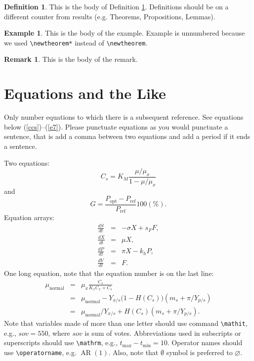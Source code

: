 \documentclass[ecta,nameyear,draft]{econsocart}
\theoremstyle{plain}
\theoremstyle{definition}
\newtheorem{definition}{Definition}
\newtheorem*{example}{Example}
\newtheorem{remark}{Remark}
\begin{document}
\begin{definition}\label{de1}
This is the body of Definition \ref{de1}. Definitions should be on a different counter from results (e.g. Theorems, Propositions, Lemmas).
\end{definition}

\begin{example}
This is the body of the example. Example is unnumbered because we used \verb|\newtheorem*|
instead of \verb|\newtheorem|.
\end{example}

\begin{remark}
This is the body of the remark. 
\end{remark}

\section{Equations and the Like}
Only number equations to which there is a subsequent reference.
See equations below (\ref{ccs})--(\ref{e7}). Please punctuate equations as you would punctuate a sentence, that is add a comma between two equations and add a period if it ends a sentence.

Two equations:
\begin{equation}
    C_{s}  =  K_{M} \frac{\mu/\mu_{x}}{1-\mu/\mu_{x}} \label{ccs}
\end{equation}
and
\begin{equation}
    G = \frac{P_{\mathrm{opt}} - P_{\mathrm{ref}}}{P_{\mathrm{ref}}}  100(\%).
\end{equation}
Equation arrays:
\begin{eqnarray}
  \frac{dS}{dt} & = & - \sigma X + s_{F} F,\\
  \frac{dX}{dt} & = &   \mu    X,\\
  \frac{dP}{dt} & = &   \pi    X - k_{h} P,\\
  \frac{dV}{dt} & = &   F.
\end{eqnarray}
One long equation, note that the equation number is on the last line:
\begin{eqnarray}
 \mu_{\text{normal}} & = & \mu_{x} \frac{C_{s}}{K_{x}C_{x}+C_{s}}  \nonumber\\
                     & = & \mu_{\text{normal}} - Y_{x/s}\bigl(1-H(C_{s})\bigr)(m_{s}+\pi /Y_{p/s})\nonumber\\
                     & = & \mu_{\text{normal}}/Y_{x/s}+ H(C_{s}) (m_{s}+ \pi /Y_{p/s}).\label{e7}
\end{eqnarray}
Note that variables made of more than one letter should use command \verb|\mathit|,
e.g., $\mathit{sov}=550$, where $\mathit{sov}$ is sum of votes. Abbreviations used in subscripts or superscripts should use \verb|\mathrm|,
e.g., $t_{\mathrm{max}}-t_{\mathrm{min}} =10$. Operator names should use \verb|\operatorname|, e.g. $\operatorname{AR}(1)$. Also, note that $\emptyset$ symbol is preferred to $\varnothing$.
\end{document}
